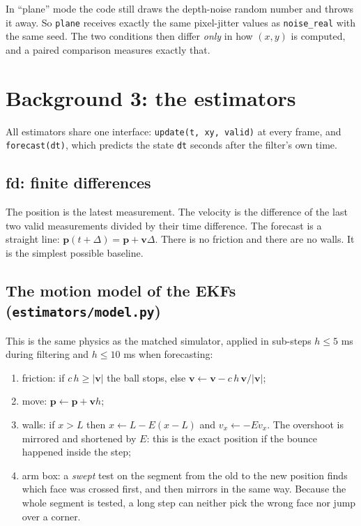 \documentclass[11pt,a4paper]{article}
\newcommand{\vv}{\bm v}\newcommand{\pp}{\bm p}\newcommand{\uu}{\bm u}
\begin{document}
\begin{idea}
In ``plane'' mode the code still draws the depth-noise random number and throws it away. So \texttt{plane} receives
exactly the same pixel-jitter values as \texttt{noise\_real} with the same seed. The two conditions then differ
\emph{only} in how $(x,y)$ is computed, and a paired comparison measures exactly that.
\end{idea}

\section{Background 3: the estimators}

All estimators share one interface: \texttt{update(t, xy, valid)} at every frame, and \texttt{forecast(dt)}, which
predicts the state \texttt{dt} seconds after the filter's own time.

\subsection{fd: finite differences}
The position is the latest measurement. The velocity is the difference of the last two valid measurements divided by
their time difference. The forecast is a straight line: $\pp(t+\Delta)=\pp+\vv\Delta$. There is no friction and there are
no walls. It is the simplest possible baseline.

\subsection{The motion model of the EKFs (\texttt{estimators/model.py})}
This is the same physics as the matched simulator, applied in sub-steps $h\le5$ ms during filtering and $h\le10$ ms
when forecasting:
\begin{enumerate}
\item friction: if $c\,h\ge|\vv|$ the ball stops, else $\vv\leftarrow\vv - c\,h\,\vv/|\vv|$;
\item move: $\pp\leftarrow\pp+\vv h$;
\item walls: if $x>L$ then $x\leftarrow L-E(x-L)$ and $v_x\leftarrow -E v_x$. The overshoot is mirrored and shortened by $E$:
  this is the exact position if the bounce happened inside the step;
\item arm box: a \emph{swept} test on the segment from the old to the new position finds which face was crossed first,
  and then mirrors in the same way. Because the whole segment is tested, a long step can neither pick the wrong face nor
  jump over a corner.
\end{enumerate}
\end{document}
